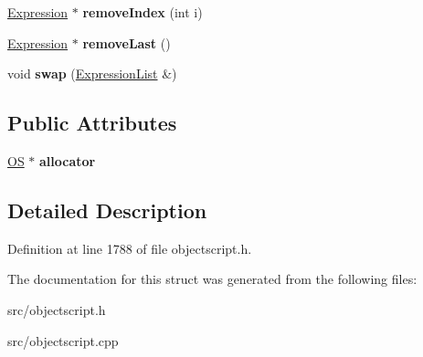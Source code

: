 \begin{DoxyCompactItemize}
\item 
\hyperlink{struct_object_script_1_1_o_s_1_1_core_1_1_compiler_1_1_expression}{Expression} $\ast$ {\bfseries remove\+Index} (int i)\hypertarget{struct_object_script_1_1_o_s_1_1_core_1_1_compiler_1_1_expression_list_a818b1b7b5b3533398a42f7a87cf38f15}{}\label{struct_object_script_1_1_o_s_1_1_core_1_1_compiler_1_1_expression_list_a818b1b7b5b3533398a42f7a87cf38f15}

\item 
\hyperlink{struct_object_script_1_1_o_s_1_1_core_1_1_compiler_1_1_expression}{Expression} $\ast$ {\bfseries remove\+Last} ()\hypertarget{struct_object_script_1_1_o_s_1_1_core_1_1_compiler_1_1_expression_list_a07a167b000428ebc2ca82bfb95270f52}{}\label{struct_object_script_1_1_o_s_1_1_core_1_1_compiler_1_1_expression_list_a07a167b000428ebc2ca82bfb95270f52}

\item 
void {\bfseries swap} (\hyperlink{struct_object_script_1_1_o_s_1_1_core_1_1_compiler_1_1_expression_list}{Expression\+List} \&)\hypertarget{struct_object_script_1_1_o_s_1_1_core_1_1_compiler_1_1_expression_list_a7562dd2a3f54fbb5e4e8d142ada12140}{}\label{struct_object_script_1_1_o_s_1_1_core_1_1_compiler_1_1_expression_list_a7562dd2a3f54fbb5e4e8d142ada12140}

\end{DoxyCompactItemize}
\subsection*{Public Attributes}
\begin{DoxyCompactItemize}
\item 
\hyperlink{class_object_script_1_1_o_s}{OS} $\ast$ {\bfseries allocator}\hypertarget{struct_object_script_1_1_o_s_1_1_core_1_1_compiler_1_1_expression_list_aed361a141d74464317f9cd4b6021e80a}{}\label{struct_object_script_1_1_o_s_1_1_core_1_1_compiler_1_1_expression_list_aed361a141d74464317f9cd4b6021e80a}

\end{DoxyCompactItemize}


\subsection{Detailed Description}


Definition at line 1788 of file objectscript.\+h.



The documentation for this struct was generated from the following files\+:\begin{DoxyCompactItemize}
\item 
src/objectscript.\+h\item 
src/objectscript.\+cpp\end{DoxyCompactItemize}
